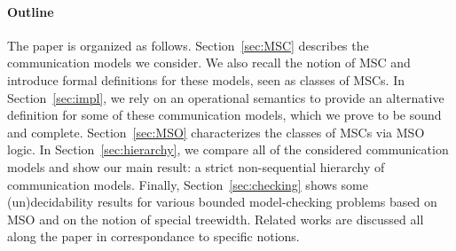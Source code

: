 \paragraph{\bf Outline} The paper is organized as follows. Section~\ref{sec:MSC} describes the communication models we consider. We also recall the notion of MSC and introduce formal definitions for these models, seen as classes of MSCs.
In Section~\ref{sec:impl}, we rely on
an operational semantics to provide an alternative definition for some of these communication models, which we prove to be sound and complete.
Section~\ref{sec:MSO} characterizes the classes of MSCs via MSO logic.
In Section~\ref{sec:hierarchy}, we compare all of the considered communication models and show our main result: a strict non-sequential hierarchy of communication models.
Finally, Section~\ref{sec:checking} shows some (un)decidability results for various bounded model-checking
problems based on MSO and on the notion of special treewidth. Related works are discussed all along the paper in correspondance to specific notions.


